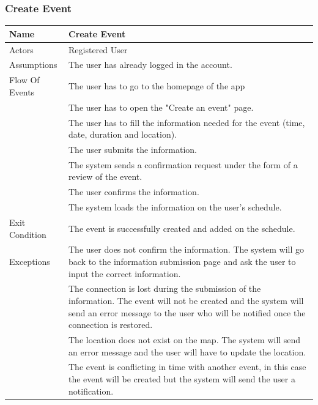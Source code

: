 \documentclass{article}
\begin{document}
\subsubsection{Create Event}
\begin{center}
\begin{tabular}{| p{3cm} || p{8cm} |}
\hline
Name & Create Event \\ \hline
Actors & Registered User \\ \hline
Assumptions & The user has already logged in the account. \\ \hline
Flow Of Events & The user has to go to the homepage of the app \\&The user has to open the "Create an event" page.\\&The user has to fill the information needed for the event (time, date, duration and location).\\&The user submits the information.\\&The system sends a confirmation request under the form of a review of the event.\\&The user confirms the information.\\&The system loads the information on the user's schedule. \\ \hline
Exit Condition & The event is successfully created and added on the schedule. \\ \hline
Exceptions &The user does not confirm the information. The system will go back to the information submission page and ask the user to input the correct information.\\& The connection is lost during the submission of the information. The event will not be created and the system will send an error message to the user who will be notified once the connection is restored. \\&The location does not exist on the map. The system will send an error message and the user will have to update the location. \\&The event is conflicting in time with another event, in this case the event will be created but the system will send the user a notification. \\
\hline
\end{tabular}
\end{center}
\end{document}
